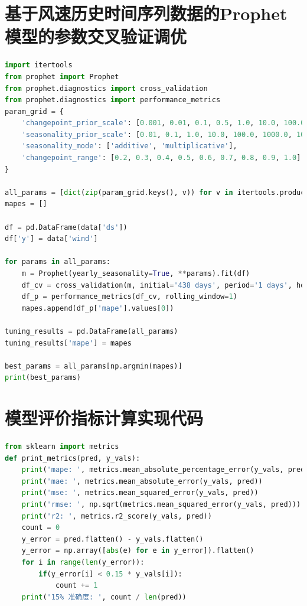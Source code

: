 \documentclass[AutoFakeBold]{LZUThesis}
\begin{document}
\section{基于风速历史时间序列数据的Prophet模型的参数交叉验证调优}

\begin{lstlisting}[language = python]
import itertools
from prophet import Prophet
from prophet.diagnostics import cross_validation
from prophet.diagnostics import performance_metrics
param_grid = {  
    'changepoint_prior_scale': [0.001, 0.01, 0.1, 0.5, 1.0, 10.0, 100.0, 1000.0, 10000.0],
    'seasonality_prior_scale': [0.01, 0.1, 1.0, 10.0, 100.0, 1000.0, 10000.0],
    'seasonality_mode': ['additive', 'multiplicative'],
    'changepoint_range': [0.2, 0.3, 0.4, 0.5, 0.6, 0.7, 0.8, 0.9, 1.0]
}

all_params = [dict(zip(param_grid.keys(), v)) for v in itertools.product(*param_grid.values())]
mapes = []

df = pd.DataFrame(data['ds'])
df['y'] = data['wind']

for params in all_params:
    m = Prophet(yearly_seasonality=True, **params).fit(df)
    df_cv = cross_validation(m, initial='438 days', period='1 days', horizon = '12H', parallel="processes")
    df_p = performance_metrics(df_cv, rolling_window=1)
    mapes.append(df_p['mape'].values[0])

tuning_results = pd.DataFrame(all_params)
tuning_results['mape'] = mapes

best_params = all_params[np.argmin(mapes)]
print(best_params)
\end{lstlisting}

\section{模型评价指标计算实现代码}

\begin{lstlisting}[language = python]
from sklearn import metrics
def print_metrics(pred, y_vals):
    print('mape: ', metrics.mean_absolute_percentage_error(y_vals, pred))
    print('mae: ', metrics.mean_absolute_error(y_vals, pred))
    print('mse: ', metrics.mean_squared_error(y_vals, pred))
    print('rmse: ', np.sqrt(metrics.mean_squared_error(y_vals, pred)))
    print('r2: ', metrics.r2_score(y_vals, pred))
    count = 0
    y_error = pred.flatten() - y_vals.flatten()
    y_error = np.array([abs(e) for e in y_error]).flatten()
    for i in range(len(y_error)):
        if(y_error[i] < 0.15 * y_vals[i]):
            count += 1
    print('15% 准确度: ', count / len(pred))
\end{lstlisting}
\end{document}
